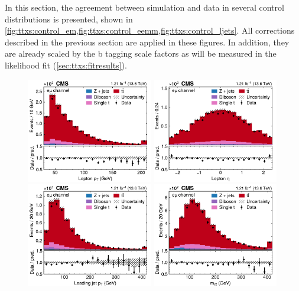 In this section, the agreement between simulation and data in several control distributions is presented, shown in \cref{fig:ttxs:control_em,fig:ttxs:control_eemm,fig:ttxs:control_ljets}. All corrections described in the previous section are applied in these figures. In addition, they are already scaled by the b tagging scale factors as will be measured in the likelihood fit (\cref{sec:ttxs:fitresults}).

\begin{figure}[!hp]
\centering
\includegraphics[width=0.49\textwidth]{figures/ttxs/lep_pt_em.pdf}
\hfill
\includegraphics[width=0.49\textwidth]{figures/ttxs/lep_eta_em.pdf}
\includegraphics[width=0.49\textwidth]{figures/ttxs/1st_jet_pt_em.pdf}
\hfill
\includegraphics[width=0.49\textwidth]{figures/ttxs/mll_em.pdf}

\end{figure}
